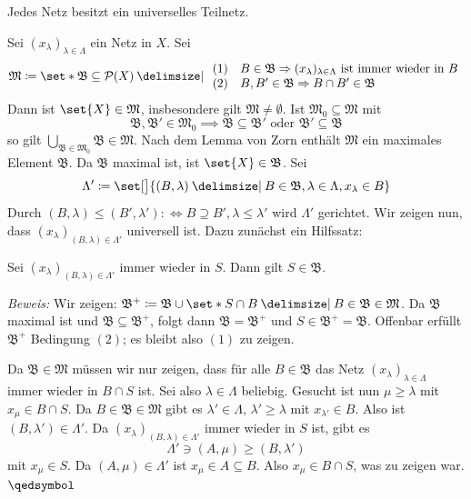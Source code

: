 \begin{proposition}[{name=[Jedes Netz besitzt ein universelles Teilnetz]},label=prop:exis-univ-netze]
	Jedes Netz besitzt ein universelles Teilnetz.
\end{proposition}
\begin{beweis}
	Sei $(x_\lambda )_{\lambda  \in \Lambda}$ ein Netz in $X$. Sei 
	\[
		\mathfrak{M} \coloneqq \set*{\mathfrak{B} \subseteq \mathcal{P}(X) \given 
		\begin{array}{ll}
			(1) & B \in \mathfrak{B} \Rightarrow (x_\lambda )_{\lambda  \in \Lambda} \text{ ist immer wieder in } B \\
			(2) & B, B' \in \mathfrak{B} \Rightarrow B \cap B' \in \mathfrak{B}
		\end{array}
		} 
	\]
	Dann ist $\set{X} \in \mathfrak{M}$, insbesondere gilt $\mathfrak{M} \neq \emptyset$. 
	Ist $\mathfrak{M}_0 \subseteq \mathfrak{M}$ mit 
	\[
		\mathfrak{B}, \mathfrak{B}' \in \mathfrak{M}_0 \implies \mathfrak{B} \subseteq \mathfrak{B}' \text{ oder } \mathfrak{B'} \subseteq \mathfrak{B}
	\]
	so gilt $\bigcup_{\mathfrak{B \in \mathfrak{M}_0}} \mathfrak{B} \in \mathfrak{M}$. 
	Nach dem Lemma von Zorn enthält $\mathfrak{M}$ ein maximales Element $\mathfrak{B}$. 
	Da $\mathfrak{B}$ maximal ist, ist $\set{X} \in \mathfrak{B}$. 
	Sei 
	\[
		\Lambda' \coloneqq \set[\big]{(B,\lambda ) \given B \in \mathfrak{B}, \lambda \in \Lambda, x_\lambda  \in B}
	\]
	Durch $(B,\lambda ) \le (B', \lambda ') :\Leftrightarrow B \supseteq B', \lambda  \le \lambda '$ wird $\Lambda'$ gerichtet.
	Wir zeigen nun, dass $(x_\lambda )_{(B,\lambda)  \in \Lambda'}$ universell ist.
	Dazu zunächst ein Hilfssatz:
	
	Sei $(x_\lambda )_{(B,\lambda)  \in \Lambda'}$ immer wieder in $S$. Dann gilt $S \in \mathfrak{B}$. 
	
	\emph{Beweis:} Wir zeigen: $\mathfrak{B}^+ \coloneqq \mathfrak{B} \cup \set*{S \cap B \given B \in \mathfrak{B}}  \in \mathfrak{M}$. 
	Da $\mathfrak{B}$ maximal ist und $\mathfrak{B} \subseteq \mathfrak{B}^+$, folgt dann $\mathfrak{B} = \mathfrak{B}^+$ und $S \in \mathfrak{B}^+ =\mathfrak{B}$. 
	Offenbar erfüllt $\mathfrak{B}^+$ Bedingung $(2)$; es bleibt also $(1)$ zu zeigen.
	
	Da $\mathfrak{B} \in \mathfrak{M}$ müssen wir nur zeigen, dass für alle $B \in \mathfrak{B}$ das Netz $(x_\lambda )_{\lambda \in \Lambda}$ immer wieder in $B \cap S$ ist. 
	Sei also $\lambda \in \Lambda$ beliebig. 
	Gesucht ist nun $\mu \ge \lambda $ mit $x_\mu \in B \cap S$. 
	Da $B \in \mathfrak{B} \in \mathfrak{M}$ gibt es $\lambda' \in \Lambda$, $\lambda' \ge \lambda $ mit $x_{\lambda'} \in B$. Also ist $(B, \lambda') \in \Lambda'$. 
	Da $(x_\lambda )_{(B,\lambda) \in \Lambda'}$ immer wieder in $S$ ist, gibt es
	\[
		\Lambda' \ni (A, \mu) \ge (B,\lambda ')
	\]
	mit $x_{\mu} \in S$. 
	Da $(A,\mu) \in \Lambda'$ ist $x_\mu \in A \subseteq B$. 
	Also $x_\mu \in B \cap S$, was zu zeigen war. $\qedsymbol$ 
	

\end{beweis}

